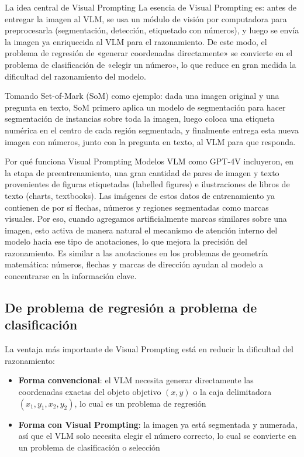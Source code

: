 \documentclass[a4paper]{article}
\begin{document}
\begin{importantbox}{La idea central de Visual Prompting}
La esencia de Visual Prompting es: antes de entregar la imagen al VLM, se usa un módulo de visión por computadora para preprocesarla (segmentación, detección, etiquetado con números), y luego se envía la imagen ya enriquecida al VLM para el razonamiento. De este modo, el problema de regresión de «generar coordenadas directamente» se convierte en el problema de clasificación de «elegir un número», lo que reduce en gran medida la dificultad del razonamiento del modelo.
\end{importantbox}

Tomando Set-of-Mark (SoM) como ejemplo: dada una imagen original y una pregunta en texto, SoM primero aplica un modelo de segmentación para hacer segmentación de instancias sobre toda la imagen, luego coloca una etiqueta numérica en el centro de cada región segmentada, y finalmente entrega esta nueva imagen con números, junto con la pregunta en texto, al VLM para que responda.

\begin{knowledgebox}{Por qué funciona Visual Prompting}
Modelos VLM como GPT-4V incluyeron, en la etapa de preentrenamiento, una gran cantidad de pares de imagen y texto provenientes de figuras etiquetadas (labelled figures) e ilustraciones de libros de texto (charts, textbooks). Las imágenes de estos datos de entrenamiento ya contienen de por sí flechas, números y regiones segmentadas como marcas visuales. Por eso, cuando agregamos artificialmente marcas similares sobre una imagen, esto activa de manera natural el mecanismo de atención interno del modelo hacia ese tipo de anotaciones, lo que mejora la precisión del razonamiento. Es similar a las anotaciones en los problemas de geometría matemática: números, flechas y marcas de dirección ayudan al modelo a concentrarse en la información clave.
\end{knowledgebox}

\subsection{De problema de regresión a problema de clasificación}

La ventaja más importante de Visual Prompting está en reducir la dificultad del razonamiento:

\begin{itemize}
    \item \textbf{Forma convencional}: el VLM necesita generar directamente las coordenadas exactas del objeto objetivo $(x, y)$ o la caja delimitadora $(x_1, y_1, x_2, y_2)$, lo cual es un problema de regresión
    \item \textbf{Forma con Visual Prompting}: la imagen ya está segmentada y numerada, así que el VLM solo necesita elegir el número correcto, lo cual se convierte en un problema de clasificación o selección
\end{itemize}
\end{document}
